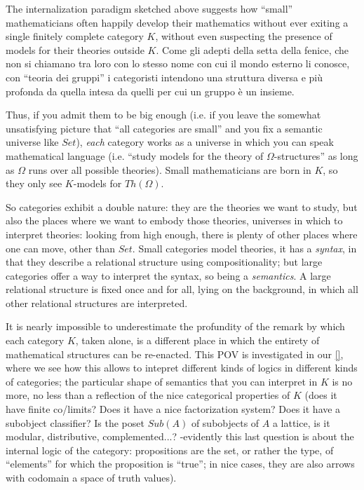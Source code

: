 The internalization paradigm sketched above suggests how ``small'' mathematicians often happily develop their mathematics without ever exiting a single finitely complete category $K$, without even suspecting the presence of models for their theories outside $K$. Come gli adepti della setta della fenice, che non si chiamano tra loro con lo stesso nome con cui il mondo esterno li conosce, con ``teoria dei gruppi'' i categoristi intendono una struttura diversa e più profonda da quella intesa da quelli per cui un gruppo è un insieme.

Thus, if you admit them to be big enough (i.e. if you leave the somewhat unsatisfying picture that ``all categories are small'' and you fix a semantic universe like $Set$), \emph{each} category works as a universe in which you can speak mathematical language (i.e. ``study models for the theory of $\Omega$-structures'' as long as $\Omega$ runs over all possible theories). Small mathematicians are born in $K$, so they only see $K$-models for $Th(\Omega)$.

So categories exhibit a double nature: they are the theories we want to study, but also the places where we want to embody those theories, universes in which to interpret theories: looking from high enough, there is plenty of other places where one can move, other than $Set$. Small categories model theories, it has a \emph{syntax}, in that they describe a relational structure using compositionality; but large categories offer a way to interpret the syntax, so being a \emph{semantics}. A large relational structure is fixed once and for all, lying on the background, in which all other relational structures are interpreted.

It is nearly impossible to underestimate the profundity of the remark by which each category $K$, taken alone, is a different place in which the entirety of mathematical structures can be re-enacted. This POV is investigated in our \autoref{}, where we see how this allows to intepret different kinds of logics in different kinds of categories; the particular shape of semantics that you can interpret in $K$ is no more, no less than a reflection of the nice categorical properties of $K$ (does it have finite co/limits? Does it have a nice factorization system? Does it have a subobject classifier? Is the poset $Sub(A)$ of subobjects of $A$ a lattice, is it modular, distributive, complemented...? -evidently this last question is about the internal logic of the category: propositions are the set, or rather the type, of ``elements'' for which the proposition is ``true''; in nice cases, they are also arrows with codomain a space of truth values).
